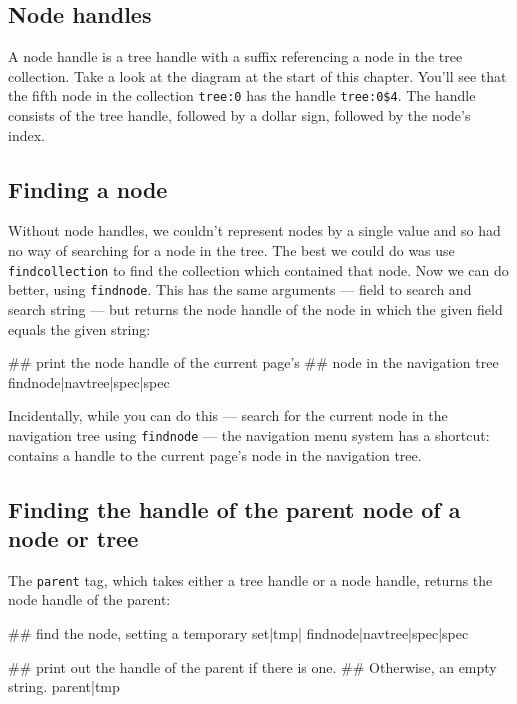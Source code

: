 \subsection{Node handles}
A node handle is a tree handle with a suffix referencing a node in the tree collection. Take a look
at the diagram at the start of this chapter. You'll see that the fifth node in the collection
\texttt{tree:0} has the handle \texttt{tree:0\$4}. The handle consists of the tree handle, followed by a
dollar sign, followed by the node's index.

\subsection{Finding a node}
Without node handles, we couldn't represent nodes by a single value and so had no way of searching for a
node in the tree. The best we could do was use \texttt{findcollection} to find the collection
which contained that node. Now we can do better, using \texttt{findnode}. This has the same arguments ---
field to search and search string --- but returns the node handle of the node in which the given field
equals the given string:
\begin{MyVerbatim}
## print the node handle of the current page's
## node in the navigation tree
{{findnode|{{navtree}}|spec|{{spec}}}}
\end{MyVerbatim}
Incidentally, while you can do this --- search for the current node in the navigation tree using
\texttt{findnode} --- the navigation menu system has a shortcut:  contains
a handle to the current page's node in the navigation tree.

\subsection{Finding the handle of the parent node of a node or tree}
The \texttt{parent} tag, which takes either a tree handle or a node handle,
returns the node handle of the parent:
\begin{MyVerbatim}
## find the node, setting a temporary
{{set|tmp|
    {{findnode|{{navtree}}|spec|{{spec}}}}}}

## print out the handle of the parent if there is one.
## Otherwise, an empty string.
{{parent|{{tmp}}}}
\end{MyVerbatim}
\clearpage
